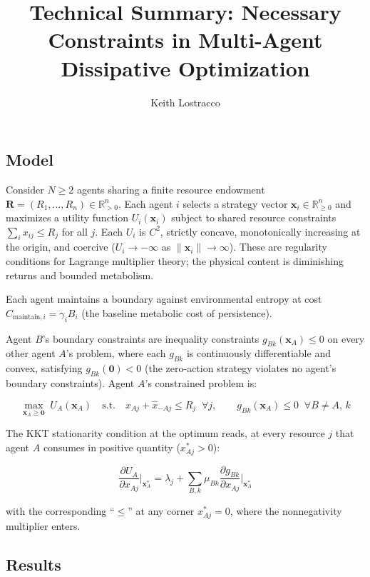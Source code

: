 \documentclass[11pt]{article}
\title{Technical Summary: Necessary Constraints in Multi-Agent
Dissipative Optimization}
\author{Keith Lostracco}
\date{}
\begin{document}
\maketitle

\subsection{Model}\label{model}

Consider \(N \geq 2\) agents sharing a finite resource endowment
\(\mathbf{R} = (R_1, \ldots, R_n) \in \mathbb{R}_{>0}^n\). Each agent
\(i\) selects a strategy vector
\(\mathbf{x}_i \in \mathbb{R}_{\geq 0}^n\) and maximizes a utility
function \(U_i(\mathbf{x}_i)\) subject to shared resource constraints
\(\sum_i x_{ij} \leq R_j\) for all \(j\). Each \(U_i\) is \(C^2\),
strictly concave, monotonically increasing at the origin, and coercive
(\(U_i \to -\infty\) as \(\|\mathbf{x}_i\| \to \infty\)). These are
regularity conditions for Lagrange multiplier theory; the physical
content is diminishing returns and bounded metabolism.

Each agent maintains a boundary against environmental entropy at cost
\(C_{\text{maintain},i} = \gamma_i B_i\) (the baseline metabolic cost of
persistence).

Agent \(B\)'s boundary constraints are inequality constraints
\(g_{Bk}(\mathbf{x}_A) \leq 0\) on every other agent \(A\)'s problem,
where each \(g_{Bk}\) is continuously differentiable and convex,
satisfying \(g_{Bk}(\mathbf{0}) < 0\) (the zero-action strategy violates
no agent's boundary constraints). Agent \(A\)'s constrained problem is:

\[\max_{\mathbf{x}_A \geq \mathbf{0}} \; U_A(\mathbf{x}_A) \quad \text{s.t.} \quad x_{Aj} + \hat{x}_{-Aj} \leq R_j \;\; \forall j, \qquad g_{Bk}(\mathbf{x}_A) \leq 0 \;\; \forall B \neq A,\, k\]

The KKT stationarity condition at the optimum reads, at every resource
\(j\) that agent \(A\) consumes in positive quantity (\(x_{Aj}^* > 0\)):

\[\frac{\partial U_A}{\partial x_{Aj}}\bigg|_{\mathbf{x}_A^*} = \lambda_j + \sum_{B,k} \mu_{Bk} \frac{\partial g_{Bk}}{\partial x_{Aj}}\bigg|_{\mathbf{x}_A^*}\]

with the corresponding ``\(\leq\)'' at any corner \(x_{Aj}^* = 0\),
where the nonnegativity multiplier enters.

\subsection{Results}\label{results}
\end{document}

